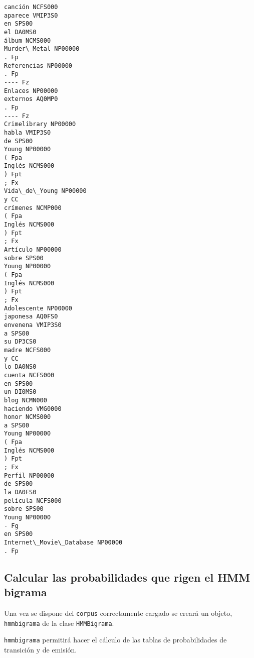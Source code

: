 \documentclass[12pt,a4paper,table]{article}
\begin{document}
\begin{Verbatim}[commandchars=\\\{\}]
canción NCFS000
aparece VMIP3S0
en SPS00
el DA0MS0
álbum NCMS000
Murder\_Metal NP00000
. Fp
Referencias NP00000
. Fp
---- Fz
Enlaces NP00000
externos AQ0MP0
. Fp
---- Fz
Crimelibrary NP00000
habla VMIP3S0
de SPS00
Young NP00000
( Fpa
Inglés NCMS000
) Fpt
; Fx
Vida\_de\_Young NP00000
y CC
crímenes NCMP000
( Fpa
Inglés NCMS000
) Fpt
; Fx
Artículo NP00000
sobre SPS00
Young NP00000
( Fpa
Inglés NCMS000
) Fpt
; Fx
Adolescente NP00000
japonesa AQ0FS0
envenena VMIP3S0
a SPS00
su DP3CS0
madre NCFS000
y CC
lo DA0NS0
cuenta NCFS000
en SPS00
un DI0MS0
blog NCMN000
haciendo VMG0000
honor NCMS000
a SPS00
Young NP00000
( Fpa
Inglés NCMS000
) Fpt
; Fx
Perfil NP00000
de SPS00
la DA0FS0
película NCFS000
sobre SPS00
Young NP00000
- Fg
en SPS00
Internet\_Movie\_Database NP00000
. Fp
    \end{Verbatim}

    \hypertarget{calcular-las-probabilidades-que-rigen-el-hmm-bigrama}{%
\subsection*{Calcular las probabilidades que rigen el HMM
bigrama}\label{calcular-las-probabilidades-que-rigen-el-hmm-bigrama}}

Una vez se dispone del \texttt{corpus} correctamente cargado se creará
un objeto, \texttt{hmmbigrama} de la clase \texttt{HMMBigrama}.

\texttt{hmmbigrama} permitirá hacer el cálculo de las tablas de
probabilidades de transición y de emisión.
\end{document}
